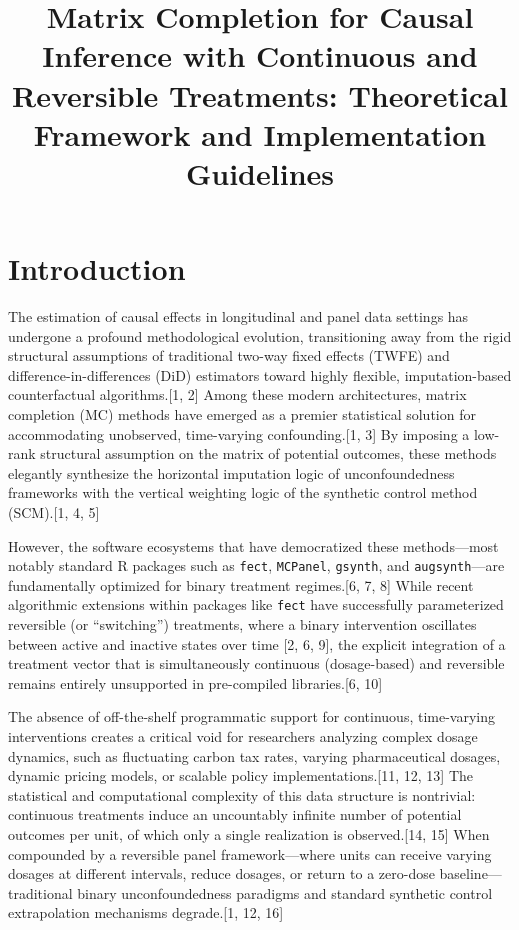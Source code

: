 \documentclass{article}
\title{Matrix Completion for Causal Inference with Continuous and Reversible Treatments: Theoretical Framework and Implementation Guidelines}
\author{}
\date{}
\begin{document}
\maketitle

\section{Introduction}

The estimation of causal effects in longitudinal and panel data settings has undergone a profound methodological evolution, transitioning away from the rigid structural assumptions of traditional two-way fixed effects (TWFE) and difference-in-differences (DiD) estimators toward highly flexible, imputation-based counterfactual algorithms.[1, 2] Among these modern architectures, matrix completion (MC) methods have emerged as a premier statistical solution for accommodating unobserved, time-varying confounding.[1, 3] By imposing a low-rank structural assumption on the matrix of potential outcomes, these methods elegantly synthesize the horizontal imputation logic of unconfoundedness frameworks with the vertical weighting logic of the synthetic control method (SCM).[1, 4, 5] 

However, the software ecosystems that have democratized these methods---most notably standard R packages such as \texttt{fect}, \texttt{MCPanel}, \texttt{gsynth}, and \texttt{augsynth}---are fundamentally optimized for binary treatment regimes.[6, 7, 8] While recent algorithmic extensions within packages like \texttt{fect} have successfully parameterized reversible (or ``switching'') treatments, where a binary intervention oscillates between active and inactive states over time [2, 6, 9], the explicit integration of a treatment vector that is simultaneously continuous (dosage-based) and reversible remains entirely unsupported in pre-compiled libraries.[6, 10] 

The absence of off-the-shelf programmatic support for continuous, time-varying interventions creates a critical void for researchers analyzing complex dosage dynamics, such as fluctuating carbon tax rates, varying pharmaceutical dosages, dynamic pricing models, or scalable policy implementations.[11, 12, 13] The statistical and computational complexity of this data structure is nontrivial: continuous treatments induce an uncountably infinite number of potential outcomes per unit, of which only a single realization is observed.[14, 15] When compounded by a reversible panel framework---where units can receive varying dosages at different intervals, reduce dosages, or return to a zero-dose baseline---traditional binary unconfoundedness paradigms and standard synthetic control extrapolation mechanisms degrade.[1, 12, 16] 
\end{document}
